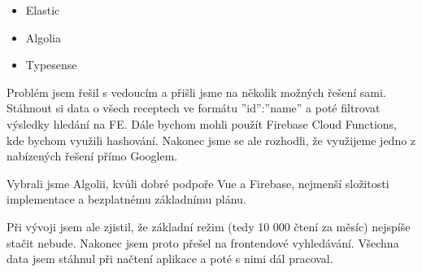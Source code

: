 \begin{itemize}
    \item Elastic
    \item Algolia
    \item Typesense
\end{itemize}

Problém jsem řešil s vedoucím a přišli jsme na několik možných řešení sami. Stáhnout si data o všech receptech ve formátu
''id'':''name'' a poté filtrovat výsledky hledání na FE. Dále bychom mohli použít Firebase Cloud Functions, kde bychom
využili hashování. Nakonec jsme se ale rozhodli, že využijeme jedno z nabízených řešení přímo Googlem.

Vybrali jsme Algolii, kvůli dobré podpoře Vue a Firebase, nejmenší složitosti implementace a bezplatnému základnímu plánu.

Při vývoji jsem ale zjistil, že základní režim (tedy 10 000 čtení za měsíc) nejspíše stačit nebude. Nakonec jsem proto přešel na
frontendové vyhledávání. Všechna data jsem stáhnul při načtení aplikace a poté s nimi dál pracoval.
